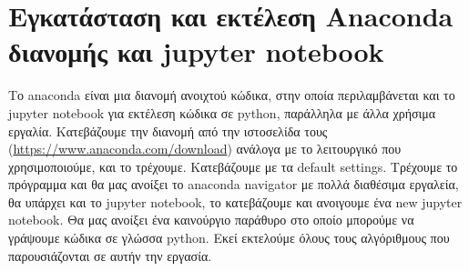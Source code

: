\section*{Εγκατάσταση και εκτέλεση {\lt Anaconda} διανομής και {\lt jupyter notebook}}

Το anaconda είναι μια διανομή ανοιχτού κώδικα, στην οποία περιλαμβάνεται και το jupyter notebook για εκτέλεση κώδικα σε python, παράλληλα με άλλα χρήσιμα εργαλία. Κατεβάζουμε την διανομή από την ιστοσελίδα τους (\url{https://www.anaconda.com/download}) ανάλογα με το λειτουργικό που χρησιμοποιούμε, και το τρέχουμε. Κατεβάζουμε με τα default settings. Τρέχουμε το πρόγραμμα και θα μας ανοίξει το anaconda navigator με πολλά διαθέσιμα εργαλεία, θα υπάρχει και το jupyter notebook, το κατεβάζουμε και ανοιγουμε ένα new jupyter notebook. Θα μας ανοίξει ένα καινούργιο παράθυρο στο οποίο μπορούμε να γράψουμε κώδικα σε γλώσσα python. Εκεί εκτελούμε όλους τους αλγόριθμους που παρουσιάζονται σε αυτήν την εργασία.
